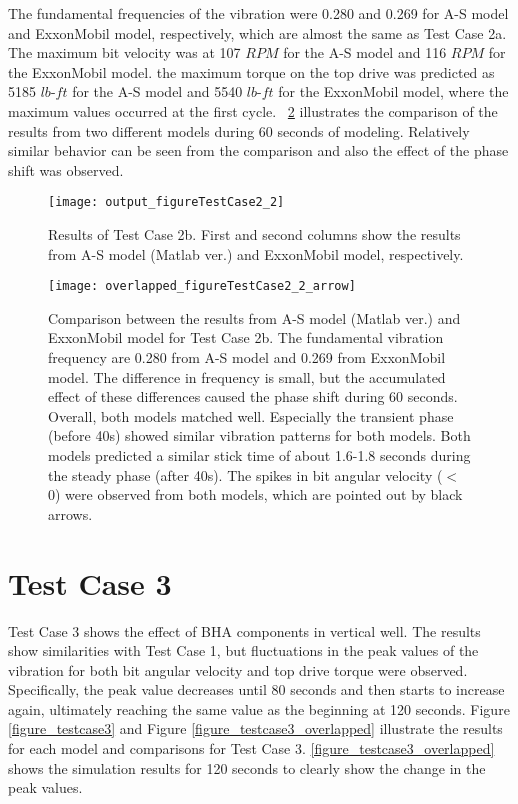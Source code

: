 The fundamental frequencies of the vibration were 0.280 and 0.269 for A-S model and ExxonMobil model, respectively, which are almost the same as Test Case 2a. The maximum bit velocity was at 107 $RPM$ for the A-S model and 116 $RPM$ for the ExxonMobil model. the maximum torque on the top drive was predicted as 5185 $lb\mbox{-}ft$ for the A-S model and 5540 $lb\mbox{-}ft$ for the ExxonMobil model, where the maximum values occurred at the first cycle. \figurename~\ref{figure_testcase2_2_overlapped} illustrates the comparison of the results from two different models during 60 seconds of modeling. Relatively similar behavior can be seen from the comparison and also the effect of the phase shift was observed.

\begin{figure}
  \centering
  \texttt{[image: output\_figureTestCase2\_2]}
  \caption[Results of Test Case 2b]{Results of Test Case 2b. First and second columns show the results from A-S model (Matlab ver.) and ExxonMobil model, respectively.}\label{figure_testcase2_2}
\end{figure}

\begin{figure}
  \centering
  \texttt{[image: overlapped\_figureTestCase2\_2\_arrow]}
  \caption[Comparison of the results for Test Case 2b]{Comparison between the results from A-S model (Matlab ver.) and ExxonMobil model for Test Case 2b. The fundamental vibration frequency are 0.280 from A-S model and 0.269 from ExxonMobil model. The difference in frequency is small, but the accumulated effect of these differences caused the phase shift during 60 seconds. Overall, both models matched well. Especially the transient phase (before 40s) showed similar vibration patterns for both models. Both models predicted a similar stick time of about 1.6-1.8 seconds during the steady phase (after 40s). The spikes in bit angular velocity ($<$ 0) were observed from both models, which are pointed out by black arrows.}\label{figure_testcase2_2_overlapped}
\end{figure}

\section{Test Case 3}
Test Case 3 shows the effect of BHA components in vertical well. The results show similarities with Test Case 1, but fluctuations in the peak values of the vibration for both bit angular velocity and top drive torque were observed. Specifically, the peak value decreases until 80 seconds and then starts to increase again, ultimately reaching the same value as the beginning at 120 seconds. Figure \ref{figure_testcase3} and Figure \ref{figure_testcase3_overlapped} illustrate the results for each model and comparisons for Test Case 3. \ref{figure_testcase3_overlapped} shows the simulation results for 120 seconds to clearly show the change in the peak values.

